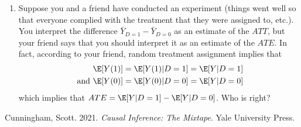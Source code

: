 \documentclass[
  letterpaper,
  DIV=11,
  numbers=noendperiod]{scrreprt}
\newlength{\cslhangindent}
\newenvironment{CSLReferences}[2] %
 {\begin{list}{}{%
  \setlength{\itemindent}{0pt}
  \setlength{\leftmargin}{0pt}
  \setlength{\parsep}{0pt}
  \ifodd #1
   \setlength{\leftmargin}{\cslhangindent}
   \setlength{\itemindent}{-1\cslhangindent}
  \fi
  \setlength{\itemsep}{#2\baselineskip}}}
 {\end{list}}
\begin{document}
\begin{enumerate}
  \begin{enumerate}
  \def\labelenumii{\alph{enumii})}
  \item
    Estimating \(ATT\) by \(\bar{Y}_{D=1} - \bar{Y}_{D=0}\). What
    condition do you need to believe in order for this approach to
    deliver a valid estimate of the \(ATT\)? Does this condition seem
    likely to hold in this context? Explain.
  \item
    Run the regression \(Y_i = \beta_0 + \alpha D_i + U_i\) using
    \(Z_i\) as an instrument. Go through the conditions for a valid
    instrument and explain whether or not each of these conditions is
    likely to hold in this context. Assuming that all four conditions
    hold, how do you interpret the estimated coefficient on \(D\) in
    this regression?
  \end{enumerate}
\item
  Suppose you and a friend have conducted an experiment (things went
  well so that everyone complied with the treatment that they were
  assigned to, etc.). You interpret the difference
  \(\bar{Y}_{D=1} - \bar{Y}_{D=0}\) as an estimate of the \(ATT\), but
  your friend says that you should interpret it as an estimate of the
  \(ATE\). In fact, according to your friend, random treatment
  assignment implies that \begin{align*}
    & \E[Y(1)] = \E[Y(1)|D=1] = \E[Y|D=1] \\
    \text{ and } & \E[Y(0)] = \E[Y(0)|D=0] = \E[Y|D=0]
  \end{align*} which implies that \(ATE = \E[Y|D=1] - \E[Y|D=0]\). Who
  is right?
\end{enumerate}

\label{refs}
\begin{CSLReferences}{1}{0}
Cunningham, Scott. 2021. \emph{Causal Inference: The Mixtape}. Yale
University Press.

\end{CSLReferences}
\end{document}
